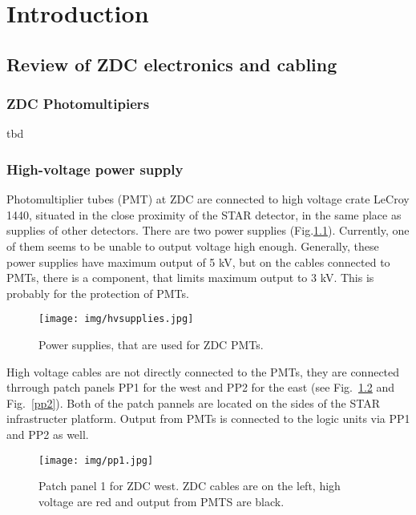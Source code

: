 \chapter{Introduction}

\section{Review of ZDC electronics and cabling}
\subsection{ZDC Photomultipiers}
tbd

\subsection{High-voltage power supply}
Photomultiplier tubes (PMT) at ZDC are connected to high voltage crate LeCroy 1440, situated in the close proximity of the STAR detector, in the same place as supplies of other detectors. There are two power supplies (Fig.\ref{hvsupplies}). Currently, one of them seems to be unable to output voltage high enough. Generally, these power supplies have maximum output of 5 kV, but on the cables connected to PMTs, there is a component, that limits maximum output to 3 kV. This is probably for the protection of PMTs.

\begin{figure}[htb]
\begin{center}
\texttt{[image: img/hvsupplies.jpg]}
\end{center}
\caption{Power supplies, that are used for ZDC PMTs.}
\label{hvsupplies}
\end{figure}

High voltage cables are not directly connected to the PMTs, they are connected thrrough patch panels PP1 for the west and PP2 for the east (see Fig.~\ref{pp1} and Fig.~\ref{pp2}). Both of the patch pannels are located on the sides of the STAR infrastructer platform. Output from PMTs is connected to the logic units via PP1 and PP2 as well.

\begin{figure}[htb]
\begin{center}
\texttt{[image: img/pp1.jpg]}
\end{center}
\caption{Patch panel 1 for ZDC west.  ZDC cables are on the left, high voltage are red and output from PMTS are black.}
\label{pp1}
\end{figure}

